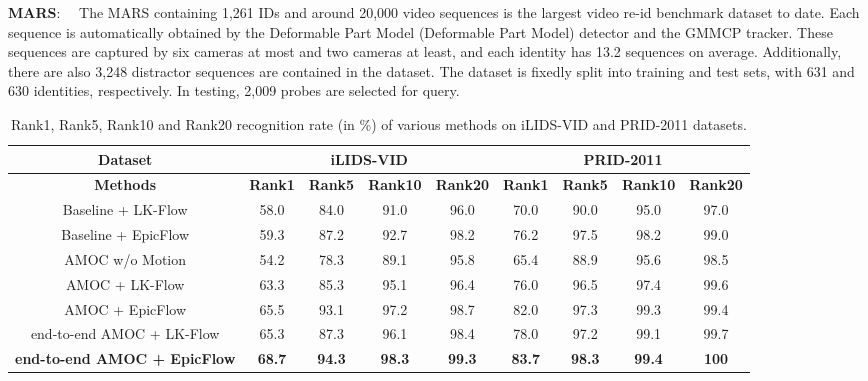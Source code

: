 \documentclass[journal]{IEEEtran}
\begin{document}
 
 \noindent\textbf{MARS}:$\quad$ The MARS containing 1,261 IDs and around 20,000 video sequences is the largest video re-id  benchmark dataset to date.  Each sequence is automatically obtained by the Deformable Part Model (Deformable Part Model)\cite{Felzenszwalb2014Object} detector and the GMMCP\cite{Dehghan2015GMMCP} tracker. These sequences are captured by six cameras at most and two cameras at least, and each identity has 13.2 sequences on average. Additionally, there are also 3,248 distractor sequences are contained in the dataset. The dataset is fixedly split into training and test sets, with 631 and 630 identities, respectively. In testing, 2,009 probes are selected for query.
 \begin{table*}[htbp]
 	\linespread{1.5}\selectfont
 	\centering
 	\caption{Rank1, Rank5, Rank10 and Rank20 recognition rate (in \%) of various  methods on iLIDS-VID and PRID-2011 datasets. }
 	\begin{tabular}{c|cccc|cccc}
 		\hline
 		\textbf{Dataset} &\multicolumn{4}{c|}{\textbf{iLIDS-VID}}&\multicolumn{4}{c}{\textbf{PRID-2011}}\\
 		\hline
 		\textbf{Methods} & \textbf{Rank1} & \textbf{Rank5} & \textbf{Rank10} & \textbf{Rank20} & \textbf{Rank1} & \textbf{Rank5} & \textbf{Rank10} & \textbf{Rank20}\\
 		\hline
 		Baseline + LK-Flow\cite{mclaughlinrecurrent} & 58.0 & 84.0 & 91.0 & 96.0 & 70.0 & 90.0 & 95.0 & 97.0\\
 		Baseline + EpicFlow\cite{revaud2015epicflow} & 59.3 & 87.2 & 92.7 & 98.2 &76.2 & 97.5&98.2 &99.0\\ 
 		AMOC w/o Motion		                                    & 54.2 & 78.3 & 89.1 & 95.8 &65.4 & 88.9 &95.6 &98.5\\ 
 		AMOC + LK-Flow & 63.3 & 85.3 & 95.1 & 96.4 &76.0 & 96.5&97.4 &99.6 \\
 		AMOC + EpicFlow & 65.5& 93.1& 97.2 & 98.7 &82.0 &97.3 &99.3 &99.4\\
 		end-to-end AMOC + LK-Flow & 65.3 & 87.3 & 96.1 & 98.4 &78.0 &97.2 &99.1 &99.7 \\
 		\hline
 		\textbf{end-to-end AMOC + EpicFlow} & \textbf{68.7} & \textbf{94.3} & \textbf{98.3} & \textbf{99.3} & \textbf{83.7} & \textbf{98.3} & \textbf{99.4} & \textbf{100} \\
 		\hline
 	\end{tabular}%
 	
 	\label{tab:lk_epic}%
 \end{table*}%
\end{document}
